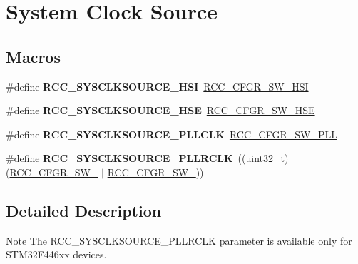 \hypertarget{group___r_c_c___system___clock___source}{}\section{System Clock Source}
\label{group___r_c_c___system___clock___source}
\subsection*{Macros}
\begin{DoxyCompactItemize}
\item 
\mbox{\label{group___r_c_c___system___clock___source_gaaeeb699502e7d7a9f1b5d57fcf1f5095}} 
\#define {\bfseries R\+C\+C\+\_\+\+S\+Y\+S\+C\+L\+K\+S\+O\+U\+R\+C\+E\+\_\+\+H\+SI}~\mbox{\hyperlink{group___peripheral___registers___bits___definition_gacbac8bae4f0808b3c3a5185aa10081fb}{R\+C\+C\+\_\+\+C\+F\+G\+R\+\_\+\+S\+W\+\_\+\+H\+SI}}
\item 
\mbox{\label{group___r_c_c___system___clock___source_ga9116d0627e1e7f33c48e1357b9a35a1c}} 
\#define {\bfseries R\+C\+C\+\_\+\+S\+Y\+S\+C\+L\+K\+S\+O\+U\+R\+C\+E\+\_\+\+H\+SE}~\mbox{\hyperlink{group___peripheral___registers___bits___definition_gafb563f217242d969f4355d0818fde705}{R\+C\+C\+\_\+\+C\+F\+G\+R\+\_\+\+S\+W\+\_\+\+H\+SE}}
\item 
\mbox{\label{group___r_c_c___system___clock___source_ga5caf08ac71d7dd7e7b2e3e421606aca7}} 
\#define {\bfseries R\+C\+C\+\_\+\+S\+Y\+S\+C\+L\+K\+S\+O\+U\+R\+C\+E\+\_\+\+P\+L\+L\+C\+LK}~\mbox{\hyperlink{group___peripheral___registers___bits___definition_ga87389cacb2eaf53730da13a2a33cd487}{R\+C\+C\+\_\+\+C\+F\+G\+R\+\_\+\+S\+W\+\_\+\+P\+LL}}
\item 
\mbox{\label{group___r_c_c___system___clock___source_ga1fa5dbd16ee193b62cfc42418a62f48d}} 
\#define {\bfseries R\+C\+C\+\_\+\+S\+Y\+S\+C\+L\+K\+S\+O\+U\+R\+C\+E\+\_\+\+P\+L\+L\+R\+C\+LK}~((uint32\+\_\+t)(\mbox{\hyperlink{group___peripheral___registers___bits___definition_ga99f08d86fd41824058a7fdf817f7e2fd}{R\+C\+C\+\_\+\+C\+F\+G\+R\+\_\+\+S\+W\+\_}} $\vert$ \mbox{\hyperlink{group___peripheral___registers___bits___definition_ga72d51cb5d66ee1aa4d2c6f14796a072f}{R\+C\+C\+\_\+\+C\+F\+G\+R\+\_\+\+S\+W\+\_}}))
\end{DoxyCompactItemize}


\subsection{Detailed Description}
\begin{DoxyNote}{Note}
The R\+C\+C\+\_\+\+S\+Y\+S\+C\+L\+K\+S\+O\+U\+R\+C\+E\+\_\+\+P\+L\+L\+R\+C\+LK parameter is available only for S\+T\+M32\+F446xx devices. 
\end{DoxyNote}
